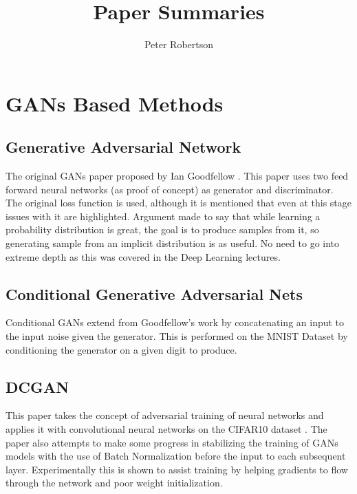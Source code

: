\documentclass[12pt]{article}
\title{Paper Summaries}
\author{Peter Robertson}
\date{}
\begin{document}
\maketitle

\section{GANs Based Methods}
\subsection{Generative Adversarial Network}
The original GANs paper proposed by Ian Goodfellow \cite{Goodfellow2014}.
This paper uses two feed forward neural networks (as proof of concept) as generator and discriminator.
The original loss function is used, although it is mentioned that even at this stage issues with it are highlighted.
Argument made to say that while learning a probability distribution is great, the goal is to produce samples from it, so generating sample from an implicit distribution is as useful.
No need to go into extreme depth as this was covered in the Deep Learning lectures.

\subsection{Conditional Generative Adversarial Nets}
Conditional GANs \cite{Mirza2014} extend from Goodfellow's work \cite{Goodfellow2014} by concatenating an input to the input noise given the generator.
This is performed on the MNIST Dataset \cite{LeCun2010} by conditioning the generator on a given digit to produce.


\subsection{DCGAN}
This paper \cite{Radford2016} takes the concept of adversarial training of neural networks and applies it with convolutional neural networks on the CIFAR10 dataset \cite{Krizhevsky2009}.
The paper also attempts to make some progress in stabilizing the training of GANs models with the use of Batch Normalization before the input to each subsequent layer.
Experimentally this is shown to assist training by helping gradients to flow through the network and poor weight initialization.
\end{document}
